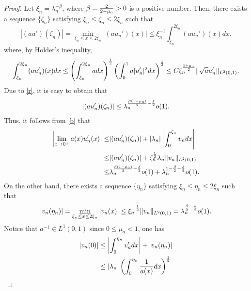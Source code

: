 \documentclass[twoside]{article}
\theoremstyle{noparens}
\theoremstyle{definition}
\numberwithin{equation}{section}
\numberwithin{figure}{section}
\begin{document}
\begin{proof}
Let $\xi_n = \lambda_n^{-\beta}$, where $\beta = {2\over2-\mu_a}>0$ is a positive number. Then,  there exists a sequence $\{\zeta_n\}$ satisfying $\xi_n\leq \zeta_n \leq 2\xi_n$ such that
\begin{equation}
	|(au')(\zeta_n)| =  \min_{\xi_n\leq x\leq 2\xi_n}|(au_n')(x)|\leq \xi_n^{-1}\int_{ \xi_n}^{2\xi_n} (au_n')(x)dx.
\end{equation}
where, by Holder's inequality,
\begin{equation}
	\begin{split}
		\int_{\xi_n}^{2\xi_n} (au_n')(x)dx
		\leq\left(\int_{\xi_n}^{2\xi_n} a  dx\right)^{1\over2}
		\left(\int_0^1 a|u_n'|^2dx\right)^{1\over2}
		\leq C\xi_n^{1+\mu_a\over2}\|\sqrt{a}u_n'\|_{L^2(0,1)}.
	\end{split}
\end{equation}
Due to \eqref{r}, it is easy to obtain that
\begin{equation}
	|(au_n')(\zeta_n)|\leq \lambda_n^{{\beta(1-\mu_a)\over2}-{\delta\over2}}o(1).
\end{equation}
Thus, it follows from \eqref{b} that
\begin{equation}\label{trans1}
	\begin{split}
		\left|\lim_{x\to 0^+}a(x)u_n'(x)\right|
		\leq &|(au_n')(\zeta_n)|+|\lambda_n|\left|\int_{0}^{\zeta_n} v_n dx\right|\\
		\leq & |(au_n')(\zeta_n)|+ \zeta_n^{1\over2}\lambda_n\|v_n\|_{L^2(0,1)}\\
		\leq & \lambda_n^{{\beta(1-\mu_a)\over2}-{\delta\over2}}o(1)
		+\lambda_n^{1-{\beta\over2}-{\delta\over2}}o(1).
	\end{split}
\end{equation}
On the other hand, there exists a sequence $\{\eta_n\}$ satisfying $\xi_n\leq \eta_n\leq 2\xi_n$ such that
\begin{equation}
	\begin{split}
		|v_n(\eta_n)| = \min_{\xi_n\leq x\leq 2\xi_n}|v_n(x)|
		\leq \xi_n^{-{1\over2}}\|v_n\|_{L^2(0,1)}
		=\lambda_n^{{\beta\over2}-{\delta\over2}}o(1).
	\end{split}
\end{equation}
Notice that $a^{-1}\in L^1(0,1)$ since $0\leq \mu_a <1$, one has
\begin{equation}\label{trans2}
	\begin{split}
		|v_n(0)|
		&\leq \left|\int_{0}^{\eta_n} v_n'dx\right| + |v_n(\eta_n)|\\
		&\leq |\lambda_n|\left(\int_{0}^{\eta_n}{1\over a(x)}dx\right)^{1\over2}

\end{split}
\end{equation}
\end{proof}
\end{document}

